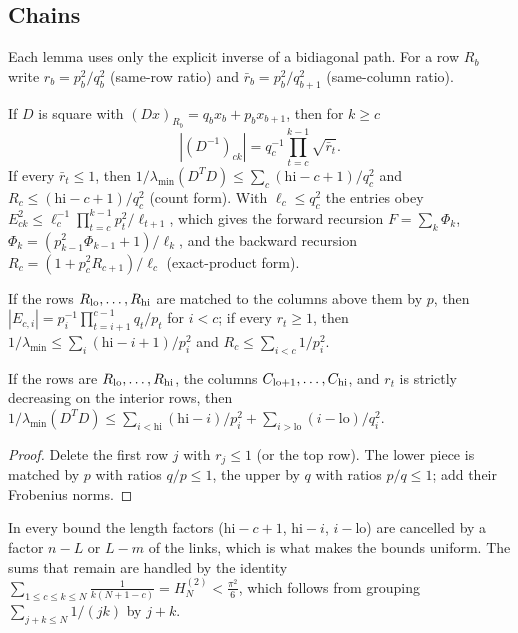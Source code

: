 \subsection{Chains}

Each lemma uses only the explicit inverse of a bidiagonal path. For a row $R_b$ write
$r_b=p_b^2/q_b^2$ (same-row ratio) and $\bar r_b=p_b^2/q_{b+1}^2$ (same-column ratio).

\begin{lemma}[CR chains]\label{lem:CR}
If $D$ is square with $(Dx)_{R_b}=q_bx_b+p_bx_{b+1}$, then for $k\ge c$
\[
  |(D^{-1})_{ck}|=q_c^{-1}\prod_{t=c}^{k-1}\sqrt{\bar r_t}.
\] If every $\bar r_t\le1$, then
$1/\lambda_{\min}(D^TD)\le\sum_c(\mathrm{hi}-c+1)/q_c^2$ and $R_c\le(\mathrm{hi}-c+1)/q_c^2$
(count form). With $\ell_c\le q_c^2$ the entries obey
$E_{ck}^2\le\ell_c^{-1}\prod_{t=c}^{k-1}p_t^2/\ell_{t+1}$, which gives the forward recursion
$F=\sum_k\Phi_k$, $\Phi_k=(p_{k-1}^2\Phi_{k-1}+1)/\ell_k$, and the backward recursion
$R_c=(1+p_c^2R_{c+1})/\ell_c$ (exact-product form).
\end{lemma}

\begin{lemma}[RC chains]\label{lem:RC}
If the rows $R_{\rm lo},\dots,R_{\rm hi}$ are matched to the columns above them by $p$, then
$|E_{c,i}|=p_i^{-1}\prod_{t=i+1}^{c-1}q_t/p_t$ for $i<c$; if every $r_t\ge1$, then
$1/\lambda_{\min}\le\sum_i(\mathrm{hi}-i+1)/p_i^2$ and $R_c\le\sum_{i<c}1/p_i^2$.
\end{lemma}

\begin{lemma}\label{lem:tall}
If the rows are $R_{\rm lo},\dots,R_{\rm hi}$, the columns $C_{\rm lo+1},\dots,C_{\rm hi}$,
and $r_t$ is strictly decreasing on the interior rows, then
$1/\lambda_{\min}(D^TD)\le\sum_{i<\mathrm{hi}}(\mathrm{hi}-i)/p_i^2+\sum_{i>\mathrm{lo}}(i-\mathrm{lo})/q_i^2$.
\end{lemma}

\begin{proof}
Delete the first row $j$ with $r_j\le1$ (or the top row). The lower piece is matched by $p$
with ratios $q/p\le1$, the upper by $q$ with ratios $p/q\le1$; add their Frobenius norms.
\end{proof}

In every bound the length factors ($\mathrm{hi}-c+1$, $\mathrm{hi}-i$, $i-\mathrm{lo}$) are
cancelled by a factor $n-L$ or $L-m$ of the links, which is what makes the bounds uniform.
The sums that remain are handled by the identity
$\sum_{1\le c\le k\le N}\frac1{k(N+1-c)}=H_N^{(2)}<\frac{\pi^2}6$, which follows from
grouping $\sum_{j+k\le N}1/(jk)$ by $j+k$.

